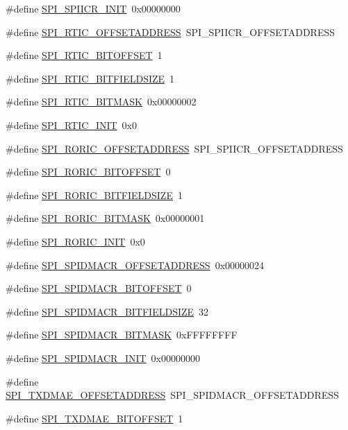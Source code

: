 \begin{DoxyCompactItemize}
\#define \hyperlink{a00573_a87eb23dc6c5cb884d038ba6da298457f}{SPI\_\-SPIICR\_\-INIT}~0x00000000
\item 
\#define \hyperlink{a00573_a7d47b349a24ce05c845fb04cc2cc2308}{SPI\_\-RTIC\_\-OFFSETADDRESS}~SPI\_\-SPIICR\_\-OFFSETADDRESS
\item 
\#define \hyperlink{a00573_ad4ff566b6cecfc9973238637da78fe52}{SPI\_\-RTIC\_\-BITOFFSET}~1
\item 
\#define \hyperlink{a00573_aab6fa54aaf63d9dc65666692e91348f9}{SPI\_\-RTIC\_\-BITFIELDSIZE}~1
\item 
\#define \hyperlink{a00573_a2807b2e4ea98c1ab83dcd2730a635531}{SPI\_\-RTIC\_\-BITMASK}~0x00000002
\item 
\#define \hyperlink{a00573_abab0e0a8f14a20e6339b64ae18ea5f53}{SPI\_\-RTIC\_\-INIT}~0x0
\item 
\#define \hyperlink{a00573_acc51cbfcdd596dfb0377ee9a57b8ba54}{SPI\_\-RORIC\_\-OFFSETADDRESS}~SPI\_\-SPIICR\_\-OFFSETADDRESS
\item 
\#define \hyperlink{a00573_a54d2e2e72b4afa7c6e31f86c4d437b43}{SPI\_\-RORIC\_\-BITOFFSET}~0
\item 
\#define \hyperlink{a00573_a7425ed2f8f04ed2b9a0bced83d4dffa4}{SPI\_\-RORIC\_\-BITFIELDSIZE}~1
\item 
\#define \hyperlink{a00573_a13749d1556601632887df6fb9dfee6f6}{SPI\_\-RORIC\_\-BITMASK}~0x00000001
\item 
\#define \hyperlink{a00573_ad656b71a7db69dcc6152f336c3cd1a59}{SPI\_\-RORIC\_\-INIT}~0x0
\item 
\#define \hyperlink{a00573_a98d31fef51cbbd7c7f15228b340f339b}{SPI\_\-SPIDMACR\_\-OFFSETADDRESS}~0x00000024
\item 
\#define \hyperlink{a00573_a883a47cfddaef8cb0a07d13ee6c9c3d2}{SPI\_\-SPIDMACR\_\-BITOFFSET}~0
\item 
\#define \hyperlink{a00573_afc70c82bcc821825a2cd32afc693662b}{SPI\_\-SPIDMACR\_\-BITFIELDSIZE}~32
\item 
\#define \hyperlink{a00573_a789032b814d4af832650941924986c0d}{SPI\_\-SPIDMACR\_\-BITMASK}~0xFFFFFFFF
\item 
\#define \hyperlink{a00573_a93c159ed0b647aa50646fc96e01698ea}{SPI\_\-SPIDMACR\_\-INIT}~0x00000000
\item 
\#define \hyperlink{a00573_abc19b1e85e7657ff99d850f41a6eddf5}{SPI\_\-TXDMAE\_\-OFFSETADDRESS}~SPI\_\-SPIDMACR\_\-OFFSETADDRESS
\item 
\#define \hyperlink{a00573_a6320c6c2a9d0f65dc5d41b31120d354c}{SPI\_\-TXDMAE\_\-BITOFFSET}~1
\item 

\end{DoxyCompactItemize}
